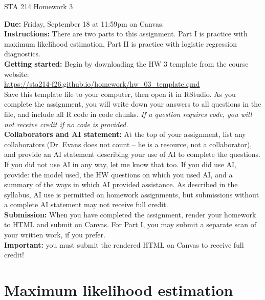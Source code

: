 \documentclass[11pt]{article}
\begin{document}
\begin{center}
\Large
STA 214 Homework 3\\
\normalsize
\vspace{5mm}
\end{center}

\noindent \textbf{Due:} Friday, September 18 at 11:59pm on Canvas.\\ 

\noindent \textbf{Instructions:} There are two parts to this assignment. Part I is practice with maximum likelihood estimation, Part II is practice with logistic regression diagnostics.\\

\noindent \textbf{Getting started:} Begin by downloading the HW 3 template from the course website:\\

\url{https://sta214-f26.github.io/homework/hw_03_template.qmd}\\

\noindent Save this template file to your computer, then open it in RStudio. As you complete the assignment, you will write down your answers to all questions in the file, and include all R code in code chunks. \textit{If a question requires code, you will not receive credit if no code is provided.}\\

\noindent \textbf{Collaborators and AI statement:} At the top of your assignment, list any collaborators (Dr. Evans does not count -- he is a resource, not a collaborator), and provide an AI statement describing your use of AI to complete the questions. If you did not use AI in any way, let me know that too. If you did use AI, provide: the model used, the HW questions on which you used AI, and a summary of the ways in which AI provided assistance. As described in the syllabus, AI use is permitted on homework assignments, but submissions without a complete AI statement may not receive full credit.\\

\noindent \textbf{Submission:} When you have completed the assignment, render your homework to HTML and submit on Canvas. For Part I, you may submit a separate scan of your written work, if you prefer.\\

\noindent \textbf{Important:} you must submit the rendered HTML on Canvas to receive full credit!

\section{Maximum likelihood estimation}
\end{document}
